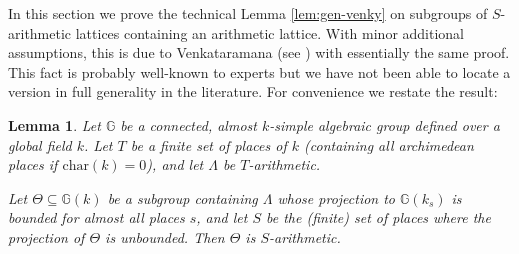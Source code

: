\documentclass[11pt]{article}
\numberwithin{equation}{section}\providecommand{\llangle}{\langle\!\langle}\providecommand{\rrangle}{\rangle\!\rangle}\providecommand{\Asterisk}{\ast}
\newcommand{\bbG}{\ensuremath{\mathbb{G}}}
\newtheorem{lemma}[thm]{Lemma}
\theoremstyle{definition}
\begin{document}
In this section we prove the technical Lemma \ref{lem:gen-venky} on subgroups of $S$-arithmetic lattices containing an arithmetic lattice. With minor additional assumptions, this is due to Venkataramana (see \cite[Prop.\,2.3]{lubotzky-zimmer}) with essentially the same proof. This fact is probably well-known to experts but we have not been able to locate a version in full generality in the literature. For convenience we restate the result:
\begin{lemma}\label{lem:regen-venky}
Let $\bbG$ be a connected, almost $k$-simple algebraic group defined over a global field $k$. Let $T$ be a finite set of places of $k$ (containing all archimedean places if $\mathrm{char}(k)=0$), and let $\Lambda$ be $T$-arithmetic.

Let $\Theta\subseteq \bbG(k)$ be a subgroup containing $\Lambda$ whose projection to $\bbG(k_s)$ is bounded for almost all places $s$, and let $S$ be the (finite) set of places where the projection of $\Theta$ is unbounded. Then $\Theta$ is $S$-arithmetic.
\end{lemma}
\end{document}
